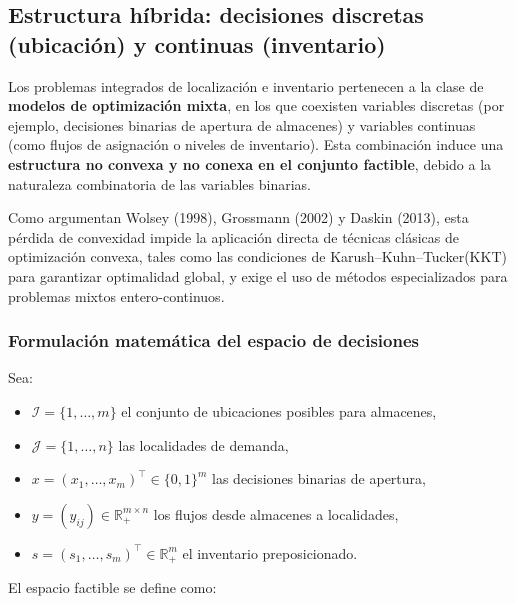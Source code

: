 \documentclass[
  spanish,
  us-letterpaper,
  DIV=11,
  numbers=noendperiod]{scrreprt}
\providecommand{\tightlist}{%
  \setlength{\itemsep}{0pt}\setlength{\parskip}{0pt}}
\numberwithin{equation}{section}
\begin{document}
\subsection{Estructura híbrida: decisiones discretas (ubicación) y
continuas
(inventario)}\label{estructura-huxedbrida-decisiones-discretas-ubicaciuxf3n-y-continuas-inventario}

Los problemas integrados de localización e inventario pertenecen a la
clase de \textbf{modelos de optimización mixta}, en los que coexisten
variables discretas (por ejemplo, decisiones binarias de apertura de
almacenes) y variables continuas (como flujos de asignación o niveles de
inventario). Esta combinación induce una \textbf{estructura no convexa y
no conexa en el conjunto factible}, debido a la naturaleza combinatoria
de las variables binarias.

Como argumentan Wolsey (1998), Grossmann (2002) y Daskin (2013), esta
pérdida de convexidad impide la aplicación directa de técnicas clásicas
de optimización convexa, tales como las condiciones de
Karush--Kuhn--Tucker(KKT) para garantizar optimalidad global, y exige el
uso de métodos especializados para problemas mixtos entero-continuos.

\subsubsection{Formulación matemática del espacio de
decisiones}\label{formulaciuxf3n-matemuxe1tica-del-espacio-de-decisiones}

Sea:

\begin{itemize}
\tightlist
\item
  \(\mathcal{I} = \{1,\ldots,m\}\) el conjunto de ubicaciones posibles
  para almacenes,
\item
  \(\mathcal{J} = \{1,\ldots,n\}\) las localidades de demanda,
\item
  \(x = (x_1,\dots,x_m)^\top \in \{0,1\}^m\) las decisiones binarias de
  apertura,
\item
  \(y = (y_{ij}) \in \mathbb{R}_+^{m\times n}\) los flujos desde
  almacenes a localidades,
\item
  \(s = (s_1,\dots,s_m)^\top \in \mathbb{R}_+^m\) el inventario
  preposicionado.
\end{itemize}

El espacio factible se define como:
\end{document}
